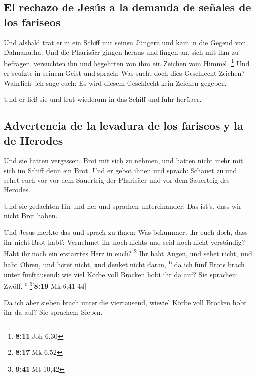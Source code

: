 \hypertarget{el-rechazo-de-jesuxfas-a-la-demanda-de-seuxf1ales-de-los-fariseos}{%
\subsection{El rechazo de Jesús a la demanda de señales de los
fariseos}\label{el-rechazo-de-jesuxfas-a-la-demanda-de-seuxf1ales-de-los-fariseos}}

 Und alsbald trat er in ein Schiff mit seinen Jüngern und
kam in die Gegend von Dalmanutha.  Und die Pharisäer
gingen heraus und fingen an, sich mit ihm zu befragen, versuchten ihn
und begehrten von ihm ein Zeichen vom Himmel. \footnote{\textbf{8:11}
  Joh 6,30}  Und er seufzte in seinem Geist und sprach:
Was sucht doch dies Geschlecht Zeichen? Wahrlich, ich sage euch: Es wird
diesem Geschlecht kein Zeichen gegeben.

 Und er ließ sie und trat wiederum in das Schiff und fuhr
herüber.

\hypertarget{advertencia-de-la-levadura-de-los-fariseos-y-la-de-herodes}{%
\subsection{Advertencia de la levadura de los fariseos y la de
Herodes}\label{advertencia-de-la-levadura-de-los-fariseos-y-la-de-herodes}}

 Und sie hatten vergessen, Brot mit sich zu nehmen, und
hatten nicht mehr mit sich im Schiff denn ein Brot.  Und
er gebot ihnen und sprach: Schauet zu und sehet euch vor vor dem
Sauerteig der Pharisäer und vor dem Sauerteig des Herodes.

 Und sie gedachten hin und her und sprachen
untereinander: Das ist's, dass wir nicht Brot haben.

 Und Jesus merkte das und sprach zu ihnen: Was bekümmert
ihr euch doch, dass ihr nicht Brot habt? Vernehmet ihr noch nichts und
seid noch nicht verständig? Habt ihr noch ein erstarrtes Herz in euch?
\footnote{\textbf{8:17} Mk 6,52}  Ihr habt Augen, und
sehet nicht, und habt Ohren, und höret nicht, und denket nicht daran,
\textsuperscript{b}  da ich fünf Brote brach unter
fünftausend: wie viel Körbe voll Brocken hobt ihr da auf? Sie sprachen:
Zwölf. \textsuperscript{c} \footnote{\textbf{9:41} Mt 10,42}{[}\textbf{8:19}
Mk 6,41-44{]}

 Da ich aber sieben brach unter die viertausend, wieviel
Körbe voll Brocken hobt ihr da auf? Sie sprachen: Sieben.

